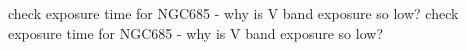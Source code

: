 check exposure time for NGC685 - why is V band exposure so low?
check exposure time for NGC685 - why is V band exposure so low?